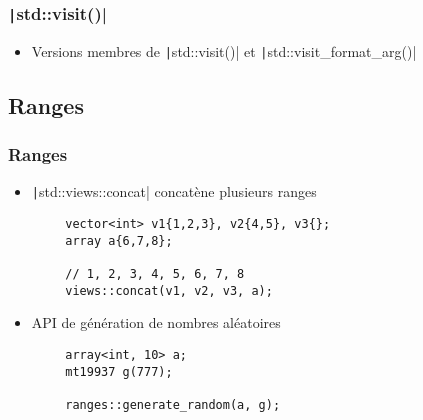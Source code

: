 \documentclass[C++.tex]{subfiles}
\begin{document}
\begin{frame}[fragile]
	\frametitle{\texttt|std::visit()|}
	\begin{itemize}
		\item Versions membres de \texttt|std::visit()| et \texttt|std::visit_format_arg()|
	\end{itemize}

\end{frame}

\subsection*{Ranges}
\begin{frame}[fragile]
	\frametitle{Ranges}
	\begin{itemize}
		\item \texttt|std::views::concat| concatène plusieurs ranges
	\end{itemize}

	\begin{verbatim}
		vector<int> v1{1,2,3}, v2{4,5}, v3{};
		array a{6,7,8};

		// 1, 2, 3, 4, 5, 6, 7, 8
		views::concat(v1, v2, v3, a);
	\end{verbatim}

	\begin{itemize}
		\item API de génération de nombres aléatoires
	\end{itemize}

	\begin{verbatim}
		array<int, 10> a;
		mt19937 g(777);

		ranges::generate_random(a, g);
	\end{verbatim}

\end{frame}
\end{document}
